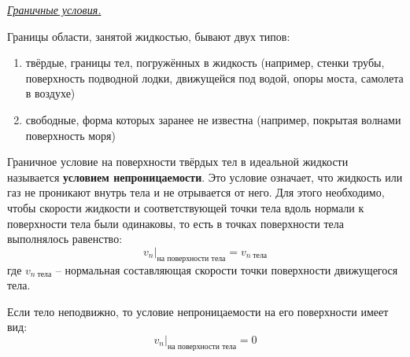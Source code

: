 \begin{center} \textit{\underline{Граничные условия.}} \end{center}

Границы области, занятой жидкостью, бывают двух типов:
\begin{enumerate}
\item твёрдые, границы тел, погружённых в жидкость (например, стенки трубы, поверхность подводной лодки, движущейся под водой, опоры моста, самолета в воздухе)
\item свободные, форма которых заранее не известна (например, покрытая волнами поверхность моря)
\end{enumerate}

\begin{defn}[Э-128] Граничное условие на поверхности твёрдых тел в идеальной жидкости называется \textbf{условием непроницаемости}. Это условие означает, что жидкость или газ не проникают внутрь тела и не отрывается от него.
Для этого необходимо, чтобы скорости жидкости и соответствующей точки тела вдоль нормали к поверхности тела были одинаковы, то есть в точках поверхности тела выполнялось равенство:
$$ \left. v_n \right|_{\text{на поверхности тела}} = v_{n \; \text{тела}}$$
где $ v_{n \; \text{тела}} $ -- нормальная составляющая скорости точки поверхности движущегося тела.
\end{defn}

Если тело неподвижно, то условие непроницаемости на его поверхности имеет вид:
$$ \left. v_n \right|_{\text{на поверхности тела}} = 0 $$